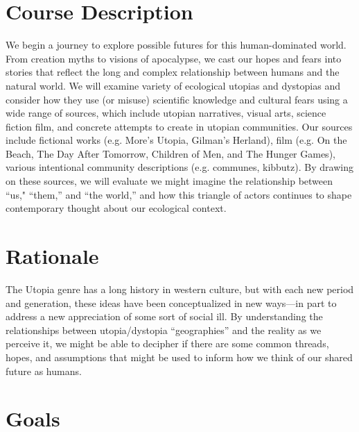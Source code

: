 



\section{Course Description} 

We begin a journey to explore possible futures for this human-dominated world. From creation myths to visions of apocalypse, we cast our hopes and fears into stories that reflect the long and complex relationship between humans and the natural world. We will examine variety of ecological utopias and dystopias and consider how they use (or misuse) scientific knowledge and cultural fears using a wide range of sources, which include utopian narratives, visual arts, science fiction film, and concrete attempts to create in utopian communities. Our sources include fictional works (e.g. More's Utopia, Gilman's Herland), film (e.g. On the Beach, The Day After Tomorrow, Children of Men, and The Hunger Games), various intentional community descriptions (e.g. communes, kibbutz). By drawing on these sources, we will evaluate we might imagine the relationship between ``us," ``them,'' and ``the world,'' and how this triangle of actors continues to shape contemporary thought about our ecological context. 

\section{Rationale}
The Utopia genre has a long history in western culture, but with each new period and generation, these ideas have been conceptualized in new ways---in part to address a new appreciation of some sort of social ill. By understanding the relationships between utopia/dystopia ``geographies'' and the reality as we perceive it, we might be able to decipher if there are some common threads, hopes, and assumptions that might be used to inform how we think of our shared future as humans.

\section{Goals} 

